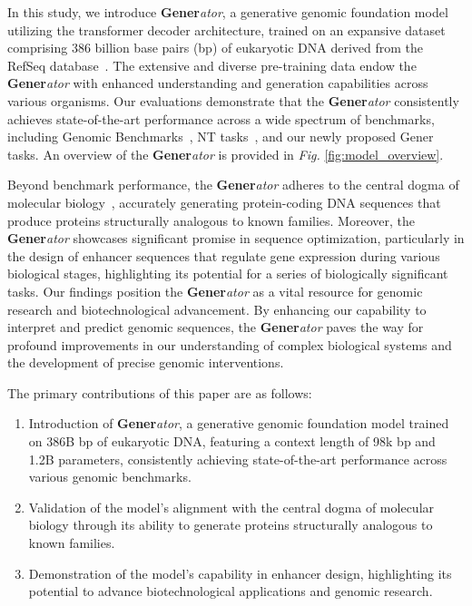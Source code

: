

In this study, we introduce \textbf{Gener}\textit{ator}, a generative genomic foundation model utilizing the transformer decoder architecture, trained on an expansive dataset comprising 386 billion base pairs (bp) of eukaryotic DNA derived from the RefSeq database~\cite{RefSeq}. The extensive and diverse pre-training data endow the \textbf{Gener}\textit{ator} with enhanced understanding and generation capabilities across various organisms. Our evaluations demonstrate that the \textbf{Gener}\textit{ator} consistently achieves state-of-the-art performance across a wide spectrum of benchmarks, including Genomic Benchmarks~\cite{genomic-benchmarks}, NT tasks~\cite{nucleotide-transformer}, and our newly proposed Gener tasks. An overview of the \textbf{Gener}\textit{ator} is provided in \textit{Fig.} \ref{fig:model_overview}.

Beyond benchmark performance, the \textbf{Gener}\textit{ator} adheres to the central dogma of molecular biology~\cite{central-dogma}, accurately generating protein-coding DNA sequences that produce proteins structurally analogous to known families. Moreover, the \textbf{Gener}\textit{ator} showcases significant promise in sequence optimization, particularly in the design of enhancer sequences that regulate gene expression during various biological stages, highlighting its potential for a series of biologically significant tasks. Our findings position the \textbf{Gener}\textit{ator} as a vital resource for genomic research and biotechnological advancement. By enhancing our capability to interpret and predict genomic sequences, the \textbf{Gener}\textit{ator} paves the way for profound improvements in our understanding of complex biological systems and the development of precise genomic interventions.

The primary contributions of this paper are as follows:
\begin{enumerate}
\item Introduction of \textbf{Gener}\textit{ator}, a generative genomic foundation model trained on 386B bp of eukaryotic DNA, featuring a context length of 98k bp and 1.2B parameters, consistently achieving state-of-the-art performance across various genomic benchmarks.

\item Validation of the model's alignment with the central dogma of molecular biology through its ability to generate proteins structurally analogous to known families.

\item Demonstration of the model's capability in enhancer design, highlighting its potential to advance biotechnological applications and genomic research.

\end{enumerate}
